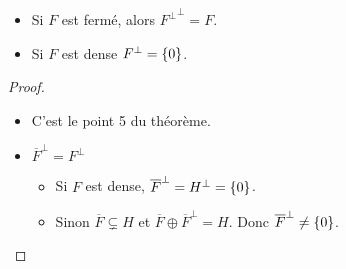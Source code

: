 \begin{coro}
	\begin{itemize}
		\item Si $F$ est fermé, alors ${F^\perp}^\perp = F$.
		\item Si $F$ est dense \ssi $F^\perp = \left\{0\right\}$.
	\end{itemize}
\end{coro}

\begin{proof}
	\begin{itemize}
		\item C'est le point 5 du théorème.
		\item $\overline{F}^\perp = F^\perp$

		      \begin{itemize}
			      \item Si $F$ est dense, $\overline{F}^\perp = H^\perp = \left\{0\right\}$.
			      \item Sinon $\overline{F} \subsetneq H$  et $ \overline{F} \oplus \overline{F}^\perp = H$.
			            Donc $\overline{F}^\perp \neq \left\{0\right\}$.
		      \end{itemize}
	\end{itemize}

\end{proof}
